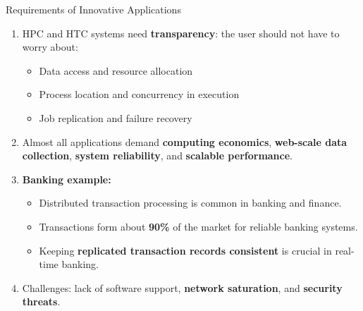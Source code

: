 \begin{frame}{Requirements of Innovative Applications}
\begin{enumerate}
\item<1-> HPC and HTC systems need \textbf{transparency}: the user should not have to worry about:
    \begin{itemize}
    \item Data access and resource allocation
    \item Process location and concurrency in execution
    \item Job replication and failure recovery
    \end{itemize}
\item<2-> Almost all applications demand \textbf{computing economics}, \textbf{web-scale data collection}, \textbf{system reliability}, and \textbf{scalable performance}.
\item<3-> \textbf{Banking example:}
    \begin{itemize}
    \item Distributed transaction processing is common in banking and finance.
    \item Transactions form about \textbf{90\%} of the market for reliable banking systems.
    \item Keeping \textbf{replicated transaction records consistent} is crucial in real-time banking.
    \end{itemize}
\item<4-> Challenges: lack of software support, \textbf{network saturation}, and \textbf{security threats}.
\end{enumerate}
\end{frame}

